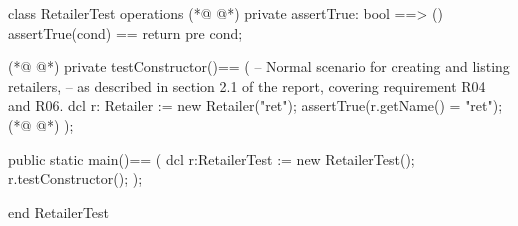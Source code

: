 \begin{vdmpp}[breaklines=true]
class RetailerTest
 operations
(*@
\label{assertTrue:3}
@*)
  private assertTrue: bool ==> ()
    assertTrue(cond) == return
    pre cond;
    
(*@
\label{testConstructor:7}
@*)
  private testConstructor()==
  (
    -- Normal scenario for creating and listing retailers,
     -- as described in section 2.1 of the report, covering requirement R04 and R06.
   dcl r: Retailer := new Retailer("ret");
   assertTrue(r.getName() = "ret");
(*@
\label{main:13}
@*)
  );
 
  public static main()==
    (
   dcl r:RetailerTest := new RetailerTest();
   r.testConstructor();
    );

end RetailerTest
\end{vdmpp}

